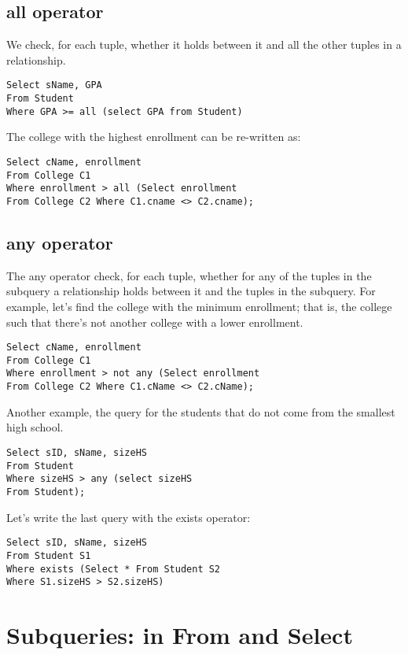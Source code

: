 \documentclass[11pt, oneside]{article}   	%
\begin{document}
\subsection{all operator}

We check, for each tuple, whether it holds between it and all the other tuples in a relationship.

\begin{lstlisting}
Select sName, GPA
From Student
Where GPA >= all (select GPA from Student)
\end{lstlisting}

The college with the highest enrollment can be re-written as:

\begin{lstlisting}
Select cName, enrollment
From College C1
Where enrollment > all (Select enrollment 
From College C2 Where C1.cname <> C2.cname);
\end{lstlisting}

\subsection{any operator}

The any operator check, for each tuple, whether for any of the tuples in the subquery a relationship holds between it and the tuples in the subquery. For example, let's find the college with the minimum enrollment; that is, the college such that there's not another college with a lower enrollment.

\begin{lstlisting}
Select cName, enrollment
From College C1
Where enrollment > not any (Select enrollment
From College C2 Where C1.cName <> C2.cName);
\end{lstlisting}

Another example, the query for the students that do not come from the smallest high school.

\begin{lstlisting}
Select sID, sName, sizeHS
From Student
Where sizeHS > any (select sizeHS
From Student);
\end{lstlisting}

Let's write the last query with the exists operator:

\begin{lstlisting}
Select sID, sName, sizeHS
From Student S1
Where exists (Select * From Student S2
Where S1.sizeHS > S2.sizeHS)
\end{lstlisting}

\section{Subqueries: in From and Select}
\end{document}
